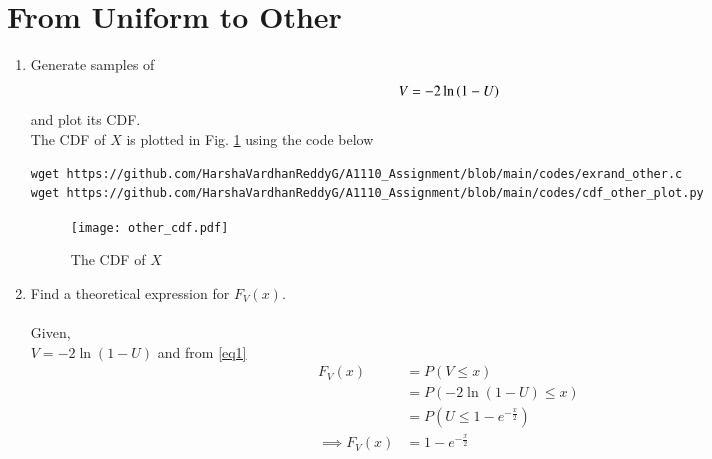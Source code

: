 \documentclass[journal,12pt,twocolumn]{IEEEtran}
\renewcommand\thesection{\arabic{section}}
\begin{document}
\section{From Uniform to Other}
\begin{enumerate}[label=\thesection.\arabic*
,ref=\thesection.\theenumi]
\item Generate samples of 
%
\begin{equation}
V = -2\ln\left(1-U\right)
\end{equation}
%
and plot its CDF. \\
\solution
The CDF of $X$ is plotted in Fig. \ref{fig:other_cdf} using the code below
\begin{lstlisting}
wget https://github.com/HarshaVardhanReddyG/A1110_Assignment/blob/main/codes/exrand_other.c
wget https://github.com/HarshaVardhanReddyG/A1110_Assignment/blob/main/codes/cdf_other_plot.py
\end{lstlisting}
\begin{figure}[ht!]
\centering
\texttt{[image: other\_cdf.pdf]}
\caption{The CDF of $X$}
\centering
\label{fig:other_cdf}
\end{figure}
    \item Find a theoretical expression for $F_V(x)$.\\
    \solution\\
    Given,\\
    $V=-2\ln{(1-U)}$
    and from \eqref{eq1}
    \begin{align}
        F_V(x)&=P(V\leq x)\\
        &=P(-2\ln{(1-U)} \leq x)\\
        &=P\left(U \leq 1-e^{-\frac{x}{2}}\right)\\
        \implies F_V(x)&=1-e^{-\frac{x}{2}}
    \end{align}
    
\end{enumerate}
\end{document}
